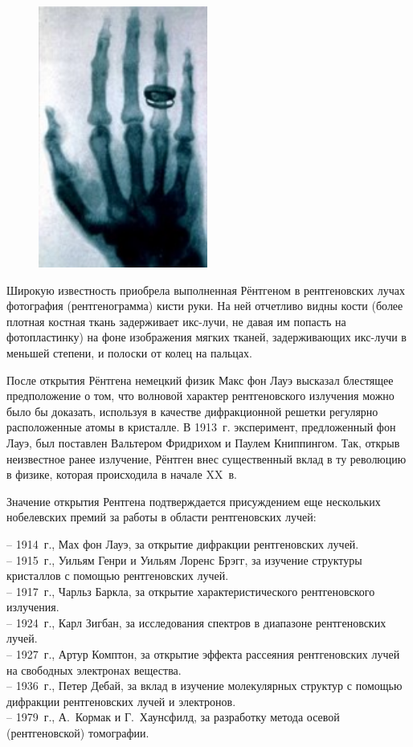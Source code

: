 \documentclass[a4paper,14pt, openany, twoside, draft]{extbook} %
\begin{document}
\begin{figure}
\centering
\includegraphics[width=5.546cm,height=8.599cm]{a11-img002.jpg}
\end{figure}
Широкую известность приобрела выполненная Рёнтгеном в рентгеновских лучах фотография (рентгенограмма) кисти руки.  На ней отчетливо видны кости (более плотная костная ткань задерживает икс-лучи, не давая им попасть на фотопластинку) на фоне изображения мягких тканей, задерживающих икс-лучи в меньшей степени, и полоски от колец на пальцах.

После открытия Рёнтгена немецкий физик Макс фон Лауэ высказал блестящее предположение о том, что волновой характер рентгеновского излучения можно было бы доказать, используя в качестве дифракционной решетки регулярно расположенные атомы в кристалле.  В 1913~г. эксперимент, предложенный фон Лауэ, был поставлен Вальтером Фридрихом и Паулем Книппингом. Так, открыв неизвестное ранее излучение, Рёнтген внес существенный вклад в ту революцию в физике, которая происходила в начале XX~в.

Значение открытия Рентгена подтверждается присуждением еще нескольких нобелевских премий за работы в области рентгеновских лучей:

– 1914~г., Мах фон Лауэ, за открытие дифракции рентгеновских лучей.\\
– 1915~г., Уильям Генри и Уильям Лоренс Брэгг, за изучение структуры кристаллов с помощью рентгеновских лучей.\\
– 1917~г., Чарльз Баркла, за открытие характеристического рентгеновского излучения.\\
– 1924~г., Карл Зигбан, за исследования спектров в диапазоне рентгеновских лучей.\\
– 1927~г., Артур Комптон, за открытие эффекта рассеяния рентгеновских лучей на свободных электронах вещества.\\
– 1936~г., Петер Дебай, за вклад в изучение молекулярных структур с помощью дифракции рентгеновских лучей и электронов.\\
– 1979~г., А.~Кормак и Г.~Хаунсфилд, за разработку метода осевой (рентгеновской) томографии.\\
\end{document}
